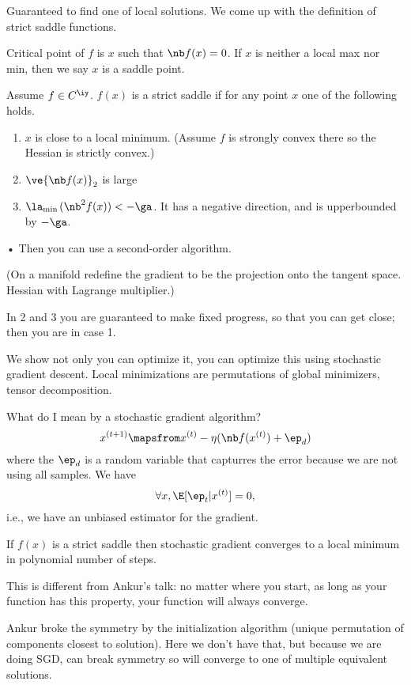 Guaranteed to find one of local solutions. We come up with the definition of strict saddle functions. 
\begin{df}
Critical point of $f$ is $x$ such that $\nb f(x)=0$. If $x$ is neither a local max nor min, then we say $x$ is a saddle point. %

Assume $f\in C^{\iy}$. $f(x)$ is a strict saddle if for any point $x$ one of the following holds. 
\begin{enumerate}
\item
$x$ is close to a local minimum. (Assume $f$ is strongly convex there so the Hessian is strictly convex.)
\item
$\ve{\nb f(x)}_2$ is large
\item
$\la_{\min{}}(\nb^2 f(x))<-\ga$. It has a negative direction, and is upperbounded by $-\ga$.
\end{enumerate}• 
Then you can use a second-order algorithm.
\end{df}
(On a manifold redefine the gradient to be the projection onto the tangent space. Hessian with Lagrange multiplier.)

In 2 and 3 you are guaranteed to make fixed progress, so that you can get close; then you are in case 1. 

We show not only you can optimize it, you can optimize this using stochastic gradient descent. 
Local minimizations are permutations of global minimizers, tensor decomposition.

What do I mean by a stochastic gradient algorithm? 
\[
x^{(t+1)} \mapsfrom x^{(t)} - \eta(\nb f(x^{(t)}) +\ep_d)
\]
where the $\ep_d$ is a random variable that capturres the error because we are not using all samples. We have 
\[\forall x, \E[\ep_t|x^{(t)}] = 0,\] 
i.e., we have an unbiased estimator for the gradient.
\begin{thm}
If $f(x)$ is a strict saddle then stochastic gradient converges to a local minimum in polynomial number of steps.
\end{thm}
This is different from Ankur's talk: no matter where you start, as long as your function has this property, your function will always converge. 

Ankur broke the symmetry by the initialization algorithm (unique permutation of components closest to solution). Here we don't have that, but because we are doing SGD, can break symmetry so will converge to one of multiple equivalent solutions.

